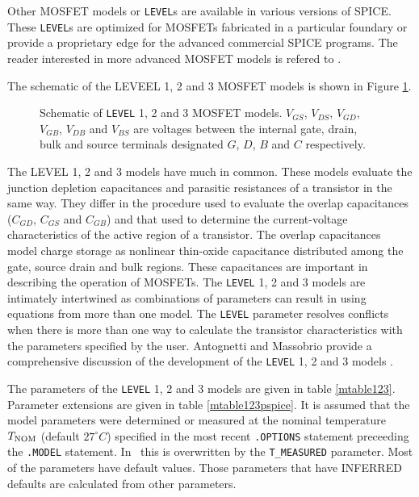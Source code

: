 Other MOSFET models or {\tt LEVEL}s are available in various versions of SPICE.
These {\tt LEVEL}s are optimized for MOSFETs fabricated in a particular
foundary or provide a proprietary edge for the advanced commercial SPICE
programs. The reader interested in more advanced MOSFET models is refered
to \cite{lee:shur:93}.\\[0.2in]
\noindent\myline
{}
\noindent\myline

The schematic of the LEVEEL 1, 2 and 3 MOSFET models is shown in Figure
\ref{mlevel123}.
\begin{figure}
\epsfxsize=2.75in\centerline{}
\caption[Schematic of {\tt LEVEL} 1, 2 and 3 MOSFET models]{Schematic of {\tt LEVEL}
1, 2 and 3 MOSFET models. \label{mlevel123}
$V_{GS}$, $V_{DS}$, $V_{GD}$, $V_{GB}$, $V_{DB}$ and $V_{BS}$ are voltages
between the internal gate, drain, bulk and source terminals designated
$G$, $D$, $B$ and $C$ respectively.
}
\end{figure}

\noindent The {LEVEL} 1, 2 and 3 models have much in common.
These models evaluate the junction depletion capacitances
and parasitic resistances of a transistor in the same way.
They differ in the procedure used to evaluate the overlap capacitances
($C_{GD}$, $C_{GS}$ and $C_{GB}$) and
that used to determine the current-voltage characteristics
of the active region of a transistor.
The overlap capacitances model charge storage as nonlinear thin-oxide
capacitance distributed among the gate, source drain and bulk regions.
These capacitances are important in describing the operation of MOSFETs.
The {\tt LEVEL} 1, 2 and 3 models are intimately intertwined as
combinations of parameters can result in using equations from more than one
model.
The {\tt LEVEL} parameter resolves conflicts when there is more than one way
to calculate the transistor characteristics with the parameters specified by
the user.
Antognetti and Massobrio provide a
comprehensive discussion of the development of the {\tt LEVEL} 1, 2 and 3 models
\cite{antognetti:massobrio:88}.

The parameters of the {\tt LEVEL} 1, 2 and 3 models are given in
table \ref{mtable123}.
Parameter extensions are given in table
\ref{mtable123pspice}.
It is assumed that the model parameters were determined or
measured at the nominal temperature $T_{\mbox{\scriptsize NOM}}$ (default
$27^{\circ}C$) specified in the most recent {\tt .OPTIONS} statement
preceeding the {\tt .MODEL} statement.
In \pspice\ this is overwritten by the {\tt T\_MEASURED} parameter.
Most of the parameters have default values. Those parameters that have INFERRED
defaults are calculated from other parameters.

